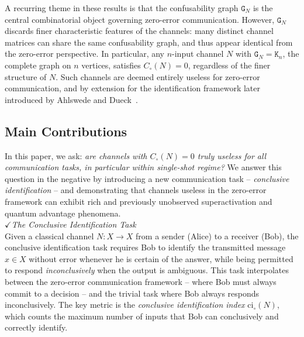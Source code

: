\documentclass[12pt,a4paper]{article}
\begin{document}
\noindent A recurring theme in these results is that the confusability graph $\mathtt{G}_N$ is the central combinatorial object governing zero-error communication. However, $\mathtt{G}_N$ discards finer characteristic features of the channels: many distinct channel matrices can share the same confusability graph, and thus appear identical from the zero-error perspective. In particular, any $n$-input channel $N$ with $\mathtt{G}_N = \mathtt{K}_n$, the complete graph on $n$ vertices, satisfies $C_\circ(N) = 0$, regardless of the finer structure of $N$. Such channels are deemed entirely useless for zero-error communication, and by extension for the identification framework later introduced by Ahlswede and Dueck~\cite{Ahlswede1989-1}.

\subsection*{Main Contributions}

\noindent In this paper, we ask: \emph{are channels with $C_\circ(N) = 0$ truly useless for all communication tasks, in particular within single-shot regime?} We answer this question in the negative by introducing a new communication task -- \emph{conclusive identification} -- and demonstrating that channels useless in the zero-error framework can exhibit rich and previously unobserved superactivation and quantum advantage phenomena.\\

\noindent$\checkmark${\it The Conclusive Identification Task}\vspace{-.30cm}\\

\noindent Given a classical channel $N : X \to X$ from a sender (Alice) to a receiver (Bob), the conclusive identification task requires Bob to identify the transmitted message $x \in X$ without error whenever he is certain of the answer, while being permitted to respond \emph{inconclusively} when the output is ambiguous. This task interpolates between the zero-error communication framework -- where Bob must always commit to a decision -- and the trivial task where Bob always responds inconclusively. The key metric is the \emph{conclusive identification index} $\mathrm{ci}_\circ(N)$, which counts the maximum number of inputs that Bob can conclusively and correctly identify.
\end{document}
